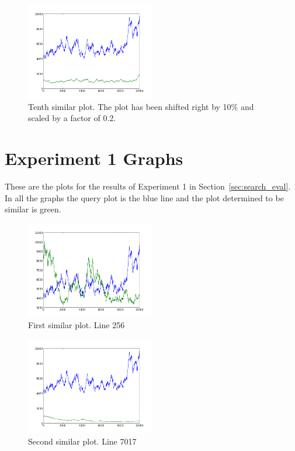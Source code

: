 \begin{figure}[h!]
    \centering
    \includegraphics[width=0.5\textwidth]{images/mutant_10.png}
    \caption{Tenth similar plot.  The plot has been shifted right by 10\% and scaled by a factor of 0.2.}
    \label{fig:mutant_10}
\end{figure}

\clearpage

\section{Experiment 1 Graphs}
\label{sec:experiment1}

These are the plots for the results of Experiment 1 in Section~\ref{sec:search_eval}.  In all the graphs the query plot is the blue line and the plot determined to be similar is green.

\begin{figure}[h!]
    \centering
    \includegraphics[width=0.5\textwidth]{images/256.png}
    \caption{First similar plot.  Line 256}
    \label{fig:ex1_1}
\end{figure}

\begin{figure}[h!]
    \centering
    \includegraphics[width=0.5\textwidth]{images/7017.png}
    \caption{Second similar plot.  Line 7017}
    \label{fig:ex1_2}
\end{figure}

